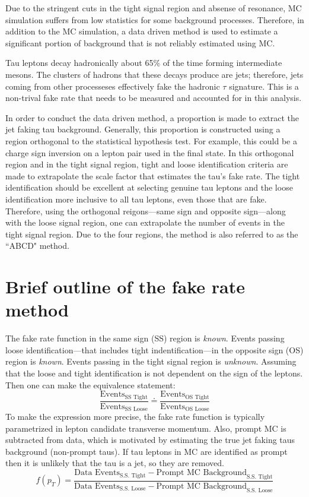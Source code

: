 
Due to the stringent cuts in the tight signal region and absense of resonance, MC simulation suffers from low statistics for some background processes.  
Therefore, in addition to the MC simulation, a data driven method is used to estimate a significant portion of background that is not reliably estimated using MC.

Tau leptons decay hadronically about 65\% of the time forming intermediate mesons. 
The clusters of hadrons that these decays produce are jets; therefore, jets coming from other processeses effectively fake the hadronic $\tau$ signature. This is a non-trival fake rate that needs to be measured and accounted for in this analysis. 

In order to conduct the data driven method, a proportion is made to extract the jet faking tau background. Generally, this proportion is constructed using a region orthogonal to the statistical hypothesis test. For example, this could be a charge sign inversion on a lepton pair used in the final state. In this orthogonal region and in the tight signal region, tight and loose identification criteria are made to extrapolate the scale factor that estimates the tau's fake rate. 
The tight identification should be excellent at selecting genuine tau leptons and the loose identification more inclusive to all tau leptons, even those that are fake. 
Therefore, using the orthogonal reigons---same sign and opposite sign---along with the loose signal region, one can extrapolate the number of events in the tight signal region. Due to the four regions, the method is also referred to as the ``ABCD" method. 


\section{Brief outline of the fake rate method}
The fake rate function in the same sign (SS) region is \textit{known}.
Events passing loose identification---that includes tight indentification---in the opposite sign (OS) region is \textit{known}.
Events passing in the tight signal region is \textit{unknown}. 
Assuming that the loose and tight identification is not dependent on the sign of the leptons. Then one can make the equivalence statement: 
\begin{equation}
\label{eq:abcd}
\frac{\text{Events}_\text{SS Tight}}{\text{Events}_\text{SS Loose}} \doteq \frac{\text{Events}_\text{OS Tight}}{\text{Events}_\text{OS Loose}}
\end{equation}
To make the expression more precise, the fake rate function is typically parametrized in lepton candidate transverse momentum. 
 Also, prompt MC is subtracted from data, which is motivated by estimating the true jet faking taus background (non-prompt taus). If tau leptons in MC are identified as prompt then it is unlikely that the tau is a jet, so they are removed. 
\begin{equation}
f(p_T)=\frac{\text{Data Events}_\text{S.S. Tight} - \text{Prompt MC Background}_\text{S.S. Tight}}{{\text{Data Events}_\text{S.S. Loose} - \text{Prompt MC Background}_\text{S.S. Loose}}}
\end{equation} 

